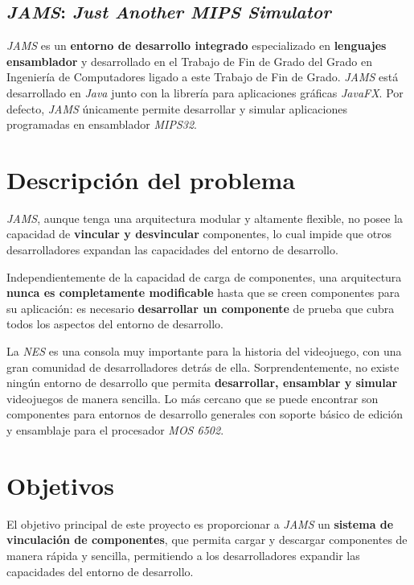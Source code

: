 \subsection{\textit{JAMS}: \textit{Just Another MIPS Simulator}}
\label{subsec:jams-just-another-mips-simulator}

\textit{JAMS} es un \textbf{entorno de desarrollo integrado} especializado
en \textbf{lenguajes ensamblador} y desarrollado en el Trabajo
de Fin de Grado del Grado en Ingeniería de Computadores ligado
a este Trabajo de Fin de Grado.
\textit{JAMS} está desarrollado en \textit{Java}\cite{JAVA} junto
con la librería para aplicaciones gráficas \textit{JavaFX}\cite{JAVAFX}.
Por defecto, \textit{JAMS} únicamente permite desarrollar y simular
aplicaciones programadas en ensamblador \textit{MIPS32}.

\section{Descripción del problema}\label{sec:descripcion-del-problema}

\textit{JAMS}, aunque tenga una arquitectura modular y altamente
flexible, no posee la capacidad de \textbf{vincular y desvincular}
componentes, lo cual impide que otros desarrolladores expandan
las capacidades del entorno de desarrollo.

Independientemente de la capacidad de carga de componentes,
una arquitectura \textbf{nunca es completamente modificable} hasta que
se creen componentes para su aplicación: es necesario
\textbf{desarrollar un componente} de prueba que cubra
todos los aspectos del entorno de desarrollo.

La \textit{NES} es una consola muy importante para la historia
del videojuego, con una gran comunidad de desarrolladores detrás
de ella.
Sorprendentemente, no existe ningún entorno de desarrollo que permita
\textbf{desarrollar, ensamblar y simular} videojuegos de manera sencilla.
Lo más cercano que se puede encontrar son componentes
para entornos de desarrollo generales con soporte básico de edición y
ensamblaje para el procesador \textit{MOS 6502}.


\section{Objetivos}\label{sec:objetivos}

El objetivo principal de este proyecto es proporcionar a \textit{JAMS}
un \textbf{sistema de vinculación de componentes}, que permita cargar
y descargar componentes de manera rápida y sencilla, permitiendo
a los desarrolladores expandir las capacidades del entorno de desarrollo.

